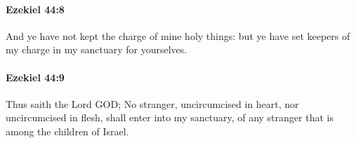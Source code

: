 		\paragraph{Ezekiel 44:8} %
			\label{EZEKIEL-44-8}

			And ye have not kept the charge of mine holy things: but ye have set keepers of my charge in my sanctuary for yourselves.


		\paragraph{Ezekiel 44:9} %
			\label{EZEKIEL-44-9}

			Thus saith the Lord GOD; No stranger, uncircumcised in heart, nor uncircumcised in flesh, shall enter into my sanctuary, of any stranger that is among the children of Israel.


